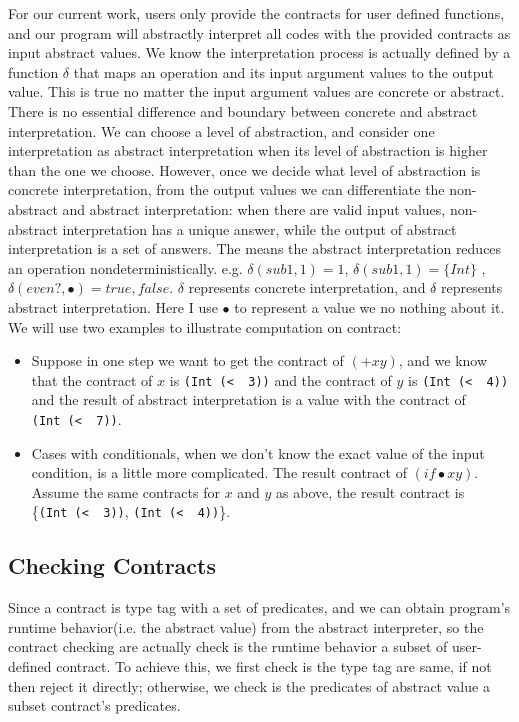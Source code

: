 \documentclass[paper=a4, fontsize=11pt]{scrartcl} %
\numberwithin{equation}{section} %
\numberwithin{figure}{section} %
\numberwithin{table}{section} %
\begin{document}
For our current work, users only provide the contracts for user defined functions, and our program will abstractly interpret all codes with the provided contracts as input abstract values.
We know the interpretation process is actually defined by a function $\delta$ that maps an operation and its input argument values to the output value. This is true no matter the input argument values are concrete or abstract. There is no essential difference and boundary between concrete and abstract interpretation. We can choose a level of abstraction, and consider one interpretation as abstract interpretation when its level of abstraction is higher than the one we choose. However, once we decide what level of abstraction is concrete interpretation, from the output values we can differentiate the non-abstract and abstract interpretation: when there are valid input values, non-abstract interpretation has a unique answer, while the output of abstract interpretation is a set of answers. The means the abstract interpretation reduces an operation nondeterministically. e.g. $\delta(sub1, 1) = 1$, $\delta\hat{}(sub1, 1) = \{Int\}$ , $\delta\hat{}(even?, \bullet) = {true, false}$. $\delta$ represents concrete interpretation, and $\delta\hat{}$ represents abstract interpretation. Here I use $\bullet$ to represent a value we no nothing about it.
We will use two examples to illustrate computation on contract:
\begin{itemize}
\item Suppose in one step we want to get the contract of $(+ x y)$, and we know that the contract of $x$ is \texttt{(Int\ (\textless\ \underscore\ 3))} and the contract of $y$ is \texttt{(Int\ (\textless\ \underscore\ 4))} and the result of abstract interpretation is a value with the contract of \texttt{(Int\ (\textless\ \underscore\ 7))}.

\item Cases with conditionals, when we don't know the exact value of the input condition, is a little more complicated. The result contract of $(if \bullet x y)$. Assume the same contracts for $x$ and $y$ as above, the result contract is \{\texttt{(Int\ (\textless\ \underscore\ 3))}, \texttt{(Int\ (\textless\ \underscore\ 4))}\}.

\end{itemize}

\subsection{Checking Contracts}
Since a contract is type tag with a set of predicates, and we can obtain program's runtime behavior(i.e. the abstract value) from the abstract interpreter, so the contract checking are actually check is the runtime behavior a subset of user-defined contract. To achieve this, we first check is the type tag are same, if not then reject it directly; otherwise, we check is the predicates of abstract value a subset contract's predicates.
\end{document}
